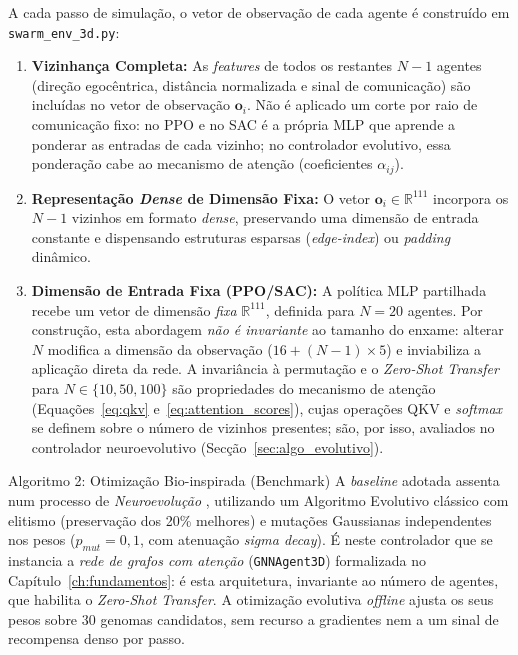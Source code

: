 \documentclass[12pt,reqno, twoside]{amsbook}
\makeatletter
\def\section{\@startsection{section}{1}%
      \z@{.5\linespacing\@plus.7\linespacing}{.25\linespacing}%
      {\normalfont\bfseries\flushleft}}
\theoremstyle{plain}
\numberwithin{equation}{chapter}
\numberwithin{section}{chapter}
\numberwithin{table}{chapter}
\numberwithin{figure}{chapter}
\makeatother
\begin{document}
A cada passo de simulação, o vetor de observação de cada agente é construído em \texttt{swarm\_env\_3d.py}:
\begin{enumerate}
    \item \textbf{Vizinhança Completa:} As \textit{features} de todos os restantes $N-1$ agentes (direção egocêntrica, distância normalizada e sinal de comunicação) são incluídas no vetor de observação $\mathbf{o}_i$. Não é aplicado um corte por raio de comunicação fixo: no PPO e no SAC é a própria MLP que aprende a ponderar as entradas de cada vizinho; no controlador evolutivo, essa ponderação cabe ao mecanismo de atenção (coeficientes $\alpha_{ij}$).
    \item \textbf{Representação \textit{Dense} de Dimensão Fixa:} O vetor $\mathbf{o}_i \in \mathbb{R}^{111}$ incorpora os $N-1$ vizinhos em formato \textit{dense}, preservando uma dimensão de entrada constante e dispensando estruturas esparsas (\textit{edge-index}) ou \textit{padding} dinâmico.
    \item \textbf{Dimensão de Entrada Fixa (PPO/SAC):} A política MLP partilhada recebe um vetor de dimensão \emph{fixa} $\mathbb{R}^{111}$, definida para $N=20$ agentes. Por construção, esta abordagem \emph{não é invariante} ao tamanho do enxame: alterar $N$ modifica a dimensão da observação ($16 + (N-1)\times 5$) e inviabiliza a aplicação direta da rede. A invariância à permutação e o \textit{Zero-Shot Transfer} para $N \in \{10, 50, 100\}$ são propriedades do mecanismo de atenção (Equações~\ref{eq:qkv} e~\ref{eq:attention_scores}), cujas operações QKV e \textit{softmax} se definem sobre o número de vizinhos presentes; são, por isso, avaliados no controlador neuroevolutivo (Secção~\ref{sec:algo_evolutivo}).
\end{enumerate}

\section{Algoritmo 2: Otimização Bio-inspirada (Benchmark)}
\label{sec:algo_evolutivo}
A \textit{baseline} adotada assenta num processo de \emph{Neuroevolução} \cite{such2017deep}, utilizando um Algoritmo Evolutivo clássico com elitismo (preservação dos 20\% melhores) e mutações Gaussianas independentes nos pesos ($p_{mut} = 0{,}1$, com atenuação \textit{sigma decay}). É neste controlador que se instancia a \emph{rede de grafos com atenção} (\texttt{GNNAgent3D}) formalizada no Capítulo~\ref{ch:fundamentos}: é esta arquitetura, invariante ao número de agentes, que habilita o \textit{Zero-Shot Transfer}. A otimização evolutiva \textit{offline} ajusta os seus pesos sobre $30$ genomas candidatos, sem recurso a gradientes nem a um sinal de recompensa denso por passo.
\end{document}
